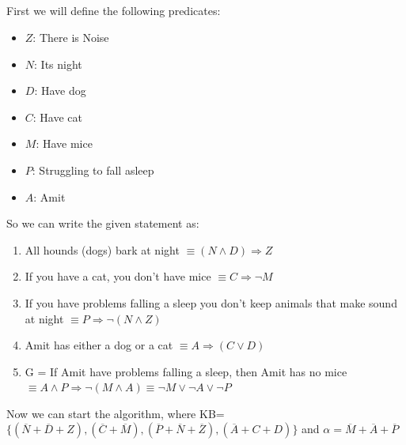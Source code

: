 \documentclass{article}
\begin{document}
\subsection{}
First we will define the following predicates:
\begin{itemize}
    \item $Z$: There is Noise
    \item $N$: Its night 
    \item $D$: Have dog 
    \item $C$: Have cat
    \item $M$: Have mice
    \item $P$: Struggling to fall asleep
    \item $A$: Amit 
\end{itemize}
So we can write the given statement as:
\begin{enumerate}
    \item All hounds (dogs) bark at night $\equiv (N \land D) \Rightarrow Z$
    \item If you have a cat, you don’t have mice $\equiv C \Rightarrow \neg M$
    \item If you have problems falling a sleep you don’t keep animals that make sound at night $\equiv P \Rightarrow \neg (N\land Z)$
    \item Amit has either a dog or a cat $\equiv A \Rightarrow (C\lor D)$
    \item G = If Amit have problems falling a sleep, then Amit has no mice $ \equiv A \land P \Rightarrow \neg (M \land A) \equiv \neg M \lor \neg A \lor \neg P $
\end{enumerate}
Now we can start the algorithm, where KB=$\{(\overline N +\overline D + Z),(\overline C + \overline M),(\overline P + \overline N + \overline Z),(\overline A + C + D)\}$ and $\alpha = \overline M +\overline A + \overline P$\\
\end{document}
